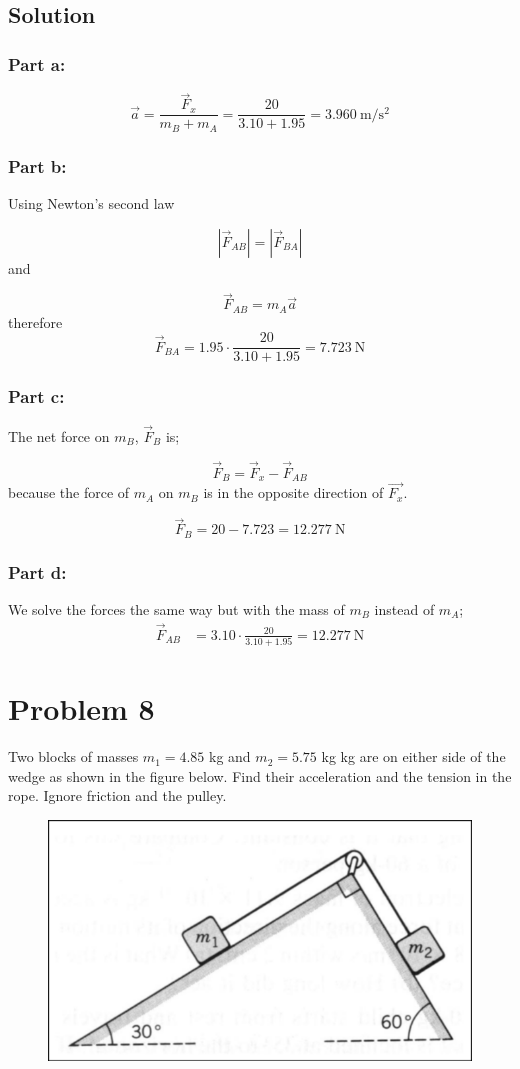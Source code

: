 \documentclass{article}
\begin{document}
\subsection*{Solution}
\subsubsection*{Part a:}
\[
	\vec{a} = \frac{\vec{F}_x}{m_B+m_A} = \frac{20}{3.10 + 1.95} = \boxed{3.960\ \text{m}/\text{s}^2}
\]

\subsubsection*{Part b:}
Using Newton's second law

\[
	\left| \vec{F}_{AB} \right| = \left|\vec{F}_{BA} \right|
\]
and

\[
	\vec{F}_{AB} = m_A \vec{a}
\]
therefore
\[
	\vec{F}_{BA} = 1.95 \cdot \frac{20}{3.10 + 1.95} = \boxed{7.723\ \text{N}}
\]

\subsubsection*{Part c:}
The net force on $m_B$, $\vec{F}_B$ is;

\[
	\vec{F}_B = \vec{F}_x - \vec{F}_{AB}
\]
because the force of $m_A$ on $m_B$ is in the opposite direction of $\vec{F_x}$.

\[
	\vec{F}_B = 20 - 7.723 = \boxed{12.277\ \text{N}}
\]

\subsubsection*{Part d:}
We solve the forces the same way but with the mass of $m_B$ instead of $m_A$;
\begin{align*}
	\vec{F}_{AB} &= 3.10 \cdot \frac{20}{3.10 + 1.95} = \boxed{12.277\ \text{N}}
\end{align*}


\section*{Problem 8}
Two blocks of masses $m_1 = 4.85$ kg and $m_2 = 5.75$ kg kg are on either side of the wedge as shown in
the figure below. Find their acceleration and the tension in the rope. Ignore friction and the pulley.
\begin{figure}[ht]
    \centering
    \includegraphics[scale=.4]{drawing-6.png}
\end{figure}
\end{document}

